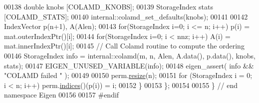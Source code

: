 \begin{DoxyCode}
00138       \textcolor{keywordtype}{double} knobs [COLAMD\_KNOBS]; 
00139       StorageIndex stats [COLAMD\_STATS];
00140       internal::colamd\_set\_defaults(knobs);
00141       
00142       IndexVector p(n+1), A(Alen); 
00143       \textcolor{keywordflow}{for}(StorageIndex i=0; i <= n; i++)   p(i) = mat.outerIndexPtr()[i];
00144       \textcolor{keywordflow}{for}(StorageIndex i=0; i < nnz; i++)  A(i) = mat.innerIndexPtr()[i];
00145       \textcolor{comment}{// Call Colamd routine to compute the ordering }
00146       StorageIndex info = internal::colamd(m, n, Alen, A.data(), p.data(), knobs, stats); 
00147       EIGEN\_UNUSED\_VARIABLE(info);
00148       eigen\_assert( info && \textcolor{stringliteral}{"COLAMD failed "} );
00149       
00150       perm.\hyperlink{group___core___module_a0e0fda6e84d69e02432e4770359bb532}{resize}(n);
00151       \textcolor{keywordflow}{for} (StorageIndex i = 0; i < n; i++) perm.\hyperlink{group___core___module_a2f1ab379207fcd1ceb33941e25cf50c2}{indices}()(p(i)) = i;
00152     \}
00153 \};
00154 
00155 \} \textcolor{comment}{// end namespace Eigen}
00156 
00157 \textcolor{preprocessor}{#endif}
\end{DoxyCode}
